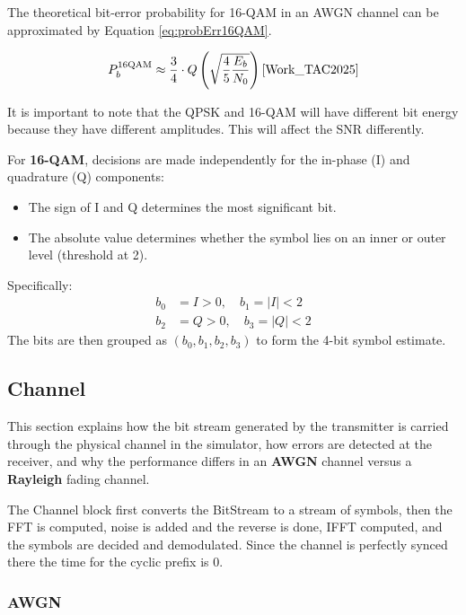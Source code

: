 The theoretical bit-error probability for 16-QAM in an AWGN channel can be approximated by Equation \ref{eq:probErr16QAM}.

\begin{equation}
  P_b^{\text{16QAM}} \approx \frac{3}{4}\cdot Q\left(\sqrt{\frac{4}{5}\frac{E_b}{N_0}}\right)\text{\cite{Work_TAC2025}}
  \label{eq:probErr16QAM}
\end{equation}

It is important to note that the QPSK and 16-QAM will have different bit energy because they have different amplitudes. This will affect the SNR differently.

For \textbf{16-QAM}, decisions are made independently for the in-phase (I) and quadrature (Q) components:
\begin{itemize}
  \item The sign of I and Q determines the most significant bit.
  \item The absolute value determines whether the symbol lies on an inner or outer level (threshold at 2).
\end{itemize}
Specifically:
\begin{align*}
  b_0 &= I > 0, \quad b_1 = |I| < 2 \\
  b_2 &= Q > 0, \quad b_3 = |Q| < 2
\end{align*}
The bits are then grouped as $(b_0, b_1, b_2, b_3)$ to form the 4-bit symbol estimate.

\subsection{Channel}

\label{sec:channel}

This section explains how the bit stream generated by the transmitter is carried through the physical channel in the simulator, how errors are detected at the receiver, and why the performance differs in an \textbf{AWGN} channel versus a \textbf{Rayleigh} fading channel.

The Channel block first converts the BitStream to a stream of symbols, then the FFT is computed, noise is added and the reverse is done, IFFT computed, and the symbols are decided and demodulated. Since the channel is perfectly synced there the time for the cyclic prefix is 0.

\subsubsection{AWGN}

